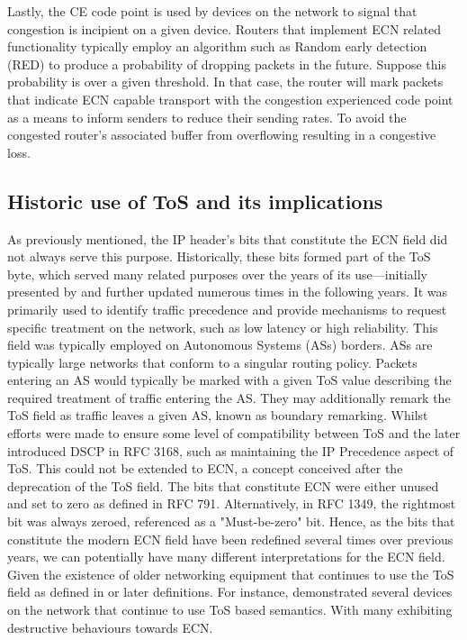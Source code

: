 \documentclass{l4proj}
\begin{document}
Lastly, the CE code point is used by devices on the network to signal that congestion is incipient on a given device. Routers that implement ECN related functionality typically employ an algorithm such as Random early detection (RED) to produce a probability of dropping packets in the future. Suppose this probability is over a given threshold. In that case, the router will mark packets that indicate ECN capable transport with the congestion experienced code point as a means to inform senders to reduce their sending rates. To avoid the congested router's associated buffer from overflowing resulting in a congestive loss.

\subsection{Historic use of ToS and its implications}

As previously mentioned, the IP header's bits that constitute the ECN field did not always serve this purpose. Historically, these bits formed part of the ToS byte, which served many related purposes over the years of its use—initially presented by \citep{rfc791} and further updated numerous times in the following years. It was primarily used to identify traffic precedence and provide mechanisms to request specific treatment on the network, such as low latency or high reliability. This field was typically employed on Autonomous Systems (ASs) borders. ASs are typically large networks that conform to a singular routing policy. Packets entering an AS would typically be marked with a given ToS value describing the required treatment of traffic entering the AS. They may additionally remark the ToS field as traffic leaves a given AS, known as boundary remarking. Whilst efforts were made to ensure some level of compatibility between ToS and the later introduced DSCP in RFC 3168, such as maintaining the IP Precedence aspect of ToS\citep{rfc3168}. This could not be extended to ECN, a concept conceived after the deprecation of the ToS field. The bits that constitute ECN were either unused and set to zero as defined in RFC 791\citep{rfc791}. Alternatively, in RFC 1349, the rightmost bit was always zeroed, referenced as a "Must-be-zero" bit\citep{rfc1349}. Hence, as the bits that constitute the modern ECN field have been redefined several times over previous years, we can potentially have many different interpretations for the ECN field. Given the existence of older networking equipment that continues to use the ToS field as defined in \cite{rfc791} or later definitions. For instance, \cite{custura_exploring_2017} demonstrated several devices on the network that continue to use ToS based semantics. With many exhibiting destructive behaviours towards ECN.
\end{document}
